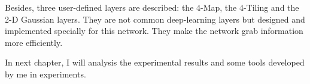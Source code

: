 \begin{spacing}{1.5}
Besides, three user-defined layers are described: the 4-Map, the 4-Tiling and the 2-D Gaussian layers. They are not common deep-learning layers but designed and implemented specially for this network. They make the network grab information more efficiently.

In next chapter, I will analysis the experimental results and some tools developed by me in experiments.

\end{spacing}
\newpage
